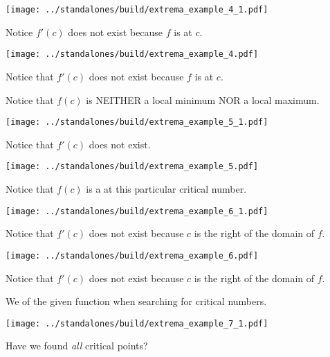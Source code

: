 \documentclass[12pt, handout]{beamer}
\begin{document}
\begin{frame}[t]
  \texttt{[image: ../standalones/build/extrema\_example\_4\_1.pdf]}

  Notice \(f'(c)\) does not exist because \(f\) is  at \(c\). 
\end{frame}

\begin{frame}[t]
  \texttt{[image: ../standalones/build/extrema\_example\_4.pdf]}
  
  Notice that \(f'(c)\) does not exist because \(f\) is  at \(c\). 
  \pause 

  Notice that \(f(c)\) is NEITHER a local minimum NOR a local maximum.
\end{frame}


\begin{frame}[t]
  \texttt{[image: ../standalones/build/extrema\_example\_5\_1.pdf]}

  Notice that \(f'(c)\) does not exist.
\end{frame}

\begin{frame}[t]
  \texttt{[image: ../standalones/build/extrema\_example\_5.pdf]}
  
  \pause 
  Notice that \(f(c)\) is a  at this particular critical number.
\end{frame}


\begin{frame}[t]
  \texttt{[image: ../standalones/build/extrema\_example\_6\_1.pdf]}

  Notice that \(f'(c)\) does not exist because \(c\) is the right  of the domain of \(f\).
\end{frame}

\begin{frame}[t]
  \texttt{[image: ../standalones/build/extrema\_example\_6.pdf]}
  
  Notice that \(f'(c)\) does not exist because \(c\) is the right  of the domain of \(f\).

  \pause        
  \hlwarn{\faExclamationTriangle{}} We  of the given function when searching for critical numbers.
\end{frame}



\begin{frame}[t]
  \texttt{[image: ../standalones/build/extrema\_example\_7\_1.pdf]}
  
  \faComment{} Have we found \emph{all} critical points?
\end{frame}
\end{document}
